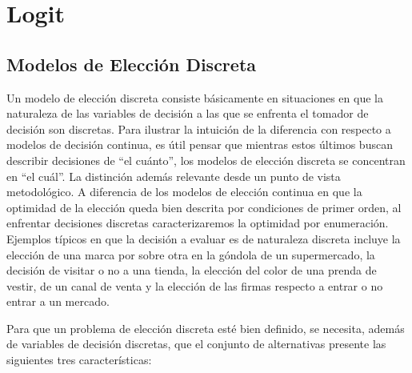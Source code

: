 \documentclass[
]{book}
\begin{document}
\hypertarget{logit}{%
\section{Logit}\label{logit}}

\hypertarget{modelos-de-elecciuxf3n-discreta}{%
\subsection{Modelos de Elección Discreta}\label{modelos-de-elecciuxf3n-discreta}}

Un modelo de elección discreta consiste básicamente en situaciones en que la naturaleza de las variables de decisión a las que se enfrenta el tomador de decisión son discretas. Para ilustrar la intuición de la diferencia con respecto a modelos de decisión continua, es útil pensar que mientras estos últimos buscan describir decisiones de ``el cuánto'', los modelos de elección discreta se concentran en ``el cuál''. La distinción además relevante desde un punto de vista metodológico. A diferencia de los modelos de elección continua en que la optimidad de la elección queda bien descrita por
condiciones de primer orden, al enfrentar decisiones discretas caracterizaremos la optimidad por enumeración. Ejemplos típicos en que la decisión a evaluar es de naturaleza discreta incluye la elección de una marca por sobre otra en la góndola de un supermercado, la decisión de visitar o no a una tienda, la elección del color de una prenda de vestir, de un canal de venta y la elección de las firmas respecto a entrar o no entrar a un mercado.

Para que un problema de elección discreta esté bien definido, se necesita, además de variables de decisión discretas, que el conjunto de alternativas presente las siguientes tres características:
\end{document}
